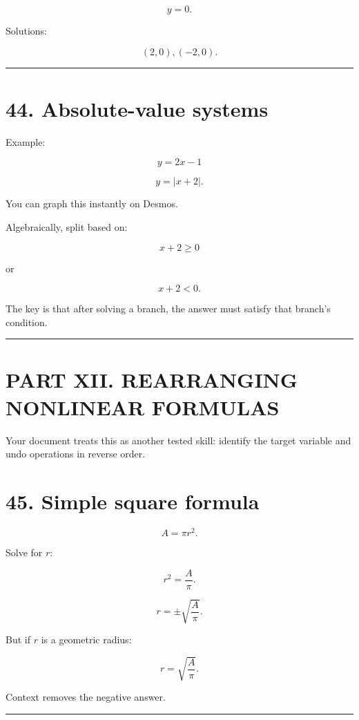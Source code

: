 \documentclass[
]{article}
\begin{document}
\[
y=0.
\]

Solutions:

\[
\boxed{(2,0),(-2,0)}.
\]

\begin{center}\rule{0.5\linewidth}{0.5pt}\end{center}

\section{44. Absolute-value systems}\label{absolute-value-systems}

Example:

\[
y=2x-1
\]

\[
y=|x+2|.
\]

You can graph this instantly on Desmos.

Algebraically, split based on:

\[
x+2\ge0
\]

or

\[
x+2<0.
\]

The key is that after solving a branch, the answer must satisfy that
branch's condition.

\begin{center}\rule{0.5\linewidth}{0.5pt}\end{center}

\section{PART XII. REARRANGING NONLINEAR
FORMULAS}\label{part-xii.-rearranging-nonlinear-formulas}

Your document treats this as another tested skill: identify the target
variable and undo operations in reverse order.

\section{45. Simple square formula}\label{simple-square-formula}

\[
A=\pi r^2.
\]

Solve for \(r\):

\[
r^2=\frac A\pi.
\]

\[
r=\pm\sqrt{\frac A\pi}.
\]

But if \(r\) is a geometric radius:

\[
\boxed{r=\sqrt{\frac A\pi}}.
\]

Context removes the negative answer.

\begin{center}\rule{0.5\linewidth}{0.5pt}\end{center}
\end{document}
